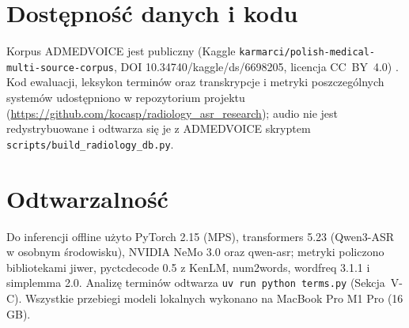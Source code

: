\documentclass[conference]{IEEEtran}
\begin{document}
\section*{Dostępność danych i kodu}
Korpus ADMEDVOICE jest publiczny (Kaggle \texttt{karmarci/polish-medical-multi-source-corpus}, DOI 10.34740/kaggle/ds/6698205, licencja CC~BY~4.0) \cite{r1}. Kod ewaluacji, leksykon terminów oraz transkrypcje i metryki poszczególnych systemów udostępniono w repozytorium projektu (\url{https://github.com/kocasp/radiology_asr_research}); audio nie jest redystrybuowane i odtwarza się je z ADMEDVOICE skryptem \texttt{scripts/build\_radiology\_db.py}.

\section*{Odtwarzalność}
Do inferencji offline użyto PyTorch 2.15 (MPS), transformers 5.23 (Qwen3-ASR w osobnym środowisku), NVIDIA NeMo 3.0 oraz qwen-asr; metryki policzono bibliotekami jiwer, pyctcdecode 0.5 z KenLM, num2words, wordfreq 3.1.1 i simplemma 2.0. Analizę terminów odtwarza \texttt{uv run python terms.py} (Sekcja~V-C). Wszystkie przebiegi modeli lokalnych wykonano na MacBook Pro M1 Pro (16\,GB).
\end{document}
